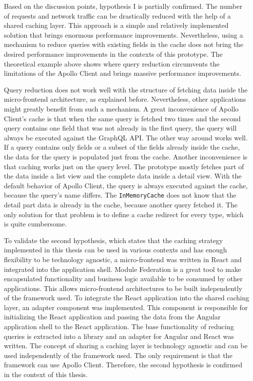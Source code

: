 \bigskip

\noindent Based on the discussion points, hypothesis I is partially confirmed. The number of requests and network traffic can be drastically reduced with the help of a shared caching layer. This approach is a simple and relatively implemented solution that brings enormous performance improvements. Nevertheless, using a mechanism to reduce queries with existing fields in the cache does not bring the desired performance improvements in the contexts of this prototype. The theoretical example above shows where query reduction circumvents the limitations of the Apollo Client and brings massive performance improvements.

\bigskip

\noindent Query reduction does not work well with the structure of fetching data inside the micro-frontend architecture, as explained before. Nevertheless, other applications might greatly benefit from such a mechanism. A great inconvenience of Apollo Client's cache is that when the same query is fetched two times and the second query contains one field that was not already in the first query, the query will always be executed against the GraphQL \ac{API}. The other way around works well. If a query contains only fields or a subset of the fields already inside the cache, the data for the query is populated just from the cache. Another inconvenience is that caching works just on the query level. The prototype mostly fetches part of the data inside a list view and the complete data inside a detail view. With the default behavior of Apollo Client, the query is always executed against the cache, because the query's name differs. The \texttt{InMemoryCache} does not know that the detail part data is already in the cache, because another query fetched it. The only solution for that problem is to define a cache redirect for every type, which is quite cumbersome.

\bigskip


\noindent To validate the second hypothesis, which states that the caching strategy implemented in this thesis can be used in various contexts and has enough flexibility to be technology agnostic, a micro-frontend was written in React and integrated into the application shell. Module Federation is a great tool to make encapsulated functionality and business logic available to be consumed by other applications. This allows micro-frontend architectures to be built independently of the framework used. To integrate the React application into the shared caching layer, an adapter component was implemented. This component is responsible for initializing the React application and passing the data from the Angular application shell to the React application. The base functionality of reducing queries is extracted into a library and an adapter for Angular and React was written. The concept of sharing a caching layer is technology agnostic and can be used independently of the framework used. The only requirement is that the framework can use Apollo Client. Therefore, the second hypothesis is confirmed in the context of this thesis.
